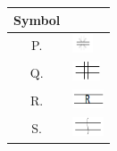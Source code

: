 \begin{tabular}[12pt]{ |c|l| }
  \hline
  \textbf{Symbol} & \\ \hline
  P. & \includegraphics[height=1.5em]{figs/vplan1.png} \\ \hline   %
  Q. & \includegraphics[height=1.5em]{figs/vplan2.png} \\ \hline   %
  R. & \includegraphics[height=1.5em]{figs/vplan3.png} \\ \hline   %
  S. & \includegraphics[height=1.5em]{figs/vplan4.png} \\ \hline   %
\end{tabular}
